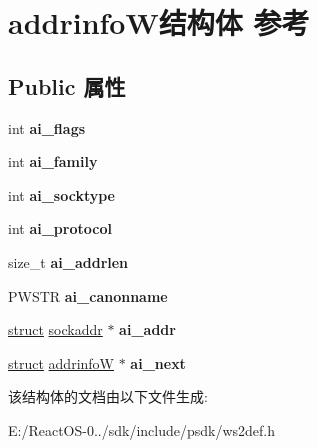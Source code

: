 \hypertarget{structaddrinfo_w}{}\section{addrinfo\+W结构体 参考}
\label{structaddrinfo_w}
\subsection*{Public 属性}
\begin{DoxyCompactItemize}
\item 
\mbox{\label{structaddrinfo_w_a6b8abc749a8911a0c7855e30b068b024}} 
int {\bfseries ai\+\_\+flags}
\item 
\mbox{\label{structaddrinfo_w_a8982a433bcaf8ca1d5367e3ecb17454d}} 
int {\bfseries ai\+\_\+family}
\item 
\mbox{\label{structaddrinfo_w_af0b9f45068e9a49bf9bc54964c3a3a5c}} 
int {\bfseries ai\+\_\+socktype}
\item 
\mbox{\label{structaddrinfo_w_a3c5ab3620f9f8c8c82ae7f03590a0aa1}} 
int {\bfseries ai\+\_\+protocol}
\item 
\mbox{\label{structaddrinfo_w_a4a0938aa386eb76c4fec033dfb747803}} 
size\+\_\+t {\bfseries ai\+\_\+addrlen}
\item 
\mbox{\label{structaddrinfo_w_a45dd148b3f0b90e898667e1092bd769c}} 
P\+W\+S\+TR {\bfseries ai\+\_\+canonname}
\item 
\mbox{\label{structaddrinfo_w_adaf30ed1043a67f481909b98eb2ba5fb}} 
\hyperlink{interfacestruct}{struct} \hyperlink{structsockaddr}{sockaddr} $\ast$ {\bfseries ai\+\_\+addr}
\item 
\mbox{\label{structaddrinfo_w_a4bf6bea316fd8764850d873daa4ca4de}} 
\hyperlink{interfacestruct}{struct} \hyperlink{structaddrinfo_w}{addrinfoW} $\ast$ {\bfseries ai\+\_\+next}
\end{DoxyCompactItemize}


该结构体的文档由以下文件生成\+:\begin{DoxyCompactItemize}
\item 
E\+:/\+React\+O\+S-\/0../sdk/include/psdk/ws2def.\+h\end{DoxyCompactItemize}
